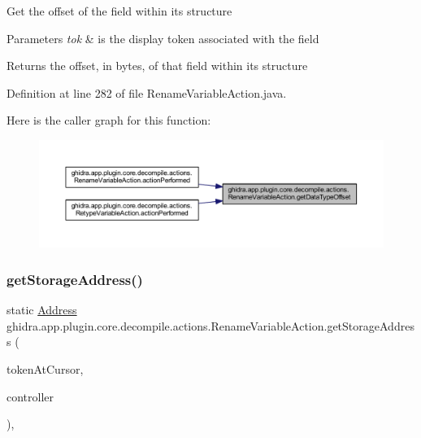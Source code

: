 Get the offset of the field within its structure 
\begin{DoxyParams}{Parameters}
{\em tok} & is the display token associated with the field \\
\hline
\end{DoxyParams}
\begin{DoxyReturn}{Returns}
the offset, in bytes, of that field within its structure 
\end{DoxyReturn}


Definition at line 282 of file Rename\+Variable\+Action.\+java.

Here is the caller graph for this function\+:
\nopagebreak
\begin{figure}[H]
\begin{center}
\leavevmode
\includegraphics[width=350pt]{classghidra_1_1app_1_1plugin_1_1core_1_1decompile_1_1actions_1_1_rename_variable_action_ac5eedef3e8e52cd9cfa2650f76341f55_icgraph}
\end{center}
\end{figure}
\mbox{\label{classghidra_1_1app_1_1plugin_1_1core_1_1decompile_1_1actions_1_1_rename_variable_action_a53116a7c562ce55a51d92040128854aa}} 
\subsubsection{\texorpdfstring{getStorageAddress()}{getStorageAddress()}}
{\footnotesize\ttfamily static \mbox{\hyperlink{class_address}{Address}} ghidra.\+app.\+plugin.\+core.\+decompile.\+actions.\+Rename\+Variable\+Action.\+get\+Storage\+Address (\begin{DoxyParamCaption}\item[{\mbox{\hyperlink{classghidra_1_1app_1_1decompiler_1_1_clang_token}{Clang\+Token}}}]{token\+At\+Cursor,  }\item[{\mbox{\hyperlink{classghidra_1_1app_1_1decompiler_1_1component_1_1_decompiler_controller}{Decompiler\+Controller}}}]{controller }\end{DoxyParamCaption})\hspace{0.3cm}{\ttfamily [inline]}, {\ttfamily [static]}}



